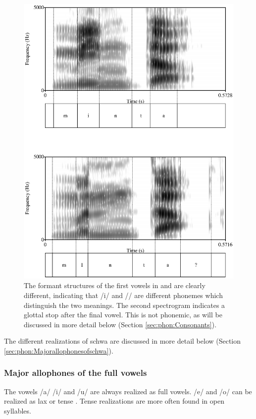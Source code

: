 \begin{figure}
 \centering
 \includegraphics[width=.8\textwidth]{pics/minthamEntha.eps}
\caption[Formant structures for  and ]{The formant structures of the first vowels in  and  are clearly different, indicating that /i/ and /\E/ are different phonemes which distinguish the two meanings. The second spectrogram indicates a glottal stop after the final vowel. This is not phonemic, as will be discussed in more detail below (Section \ref{sec:phon:Consonants}). }
\label{fig:minthamEntha}
\end{figure}



The different realizations of schwa are discussed in more detail below (Section \ref{sec:phon:Majorallophonesofschwa}).



\subsubsection{Major  allophones of the full vowels}\label{sec:phon:Majorallophonesofthefullvowels}
The vowels /a/ /i/ and /u/ are always realized as full vowels. /e/ and /o/ can be realized as lax   or tense . Tense realizations are more often found in open syllables.


